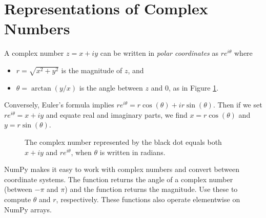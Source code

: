 \label{Lab:complex_intro}


\section*{Representations of Complex Numbers}

A complex number $z = x+iy$ can be written in \emph{polar coordinates} as $re^{i\theta}$ where
\begin{itemize}
\item $r=\sqrt{x^2+y^2}$ is the magnitude of $z$, and
\item $\theta = \arctan(y/x)$ is the angle between $z$ and 0, as in Figure \ref{fig:polar_coords}.
\end{itemize}
Conversely, Euler's formula implies $re^{i\theta} = r\cos(\theta) + ir\sin(\theta)$. Then if we set $re^{i\theta}=x+iy$ and equate real and imaginary parts, we find $x=r\cos(\theta)$ and $y=r\sin(\theta)$.

\begin{figure}
\caption{The complex number represented by the black dot equals both $x+iy$ and $re^{i\theta}$, when $\theta$ is written in radians.}
\label{fig:polar_coords}
\end{figure}

NumPy makes it easy to work with complex numbers and convert between coordinate systems. 
The function  returns the angle of a complex number (between $-\pi$ and $\pi$) and the function  returns the magnitude.
Use these to compute $\theta$ and $r$, respectively.
These functions also operate elementwise on NumPy arrays.

